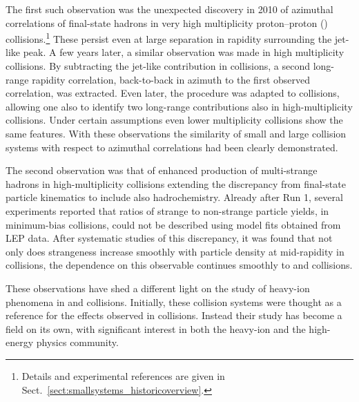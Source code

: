 \documentclass[../report.tex]{subfiles}
\begin{document}
The first such observation was the unexpected discovery in 2010 of azimuthal correlations of final-state hadrons in very high multiplicity proton--proton (\pp) collisions.\footnote{Details and experimental references are given in Sect.~\ref{sect:smallsystems_historicoverview}.} These persist even at large separation in rapidity surrounding the jet-like peak. A few years later, a similar observation was made in high multiplicity \pPb collisions. By subtracting the jet-like contribution in \pPb collisions, a second long-range rapidity correlation, back-to-back in azimuth to the first observed correlation, was extracted. Even later, the procedure was adapted to \pp collisions, allowing one also to identify two long-range contributions also in high-multiplicity \pp collisions. Under certain assumptions even lower multiplicity \pp collisions show the same features. With these observations the similarity of small and large collision systems with respect to azimuthal correlations had been clearly demonstrated.

The second observation was that of enhanced production of multi-strange hadrons in high-multiplicity \pp collisions extending the discrepancy from final-state particle kinematics to include also hadrochemistry. Already after Run 1, several experiments reported that ratios of strange to non-strange particle yields, in minimum-bias collisions, could not be described using model fits obtained from LEP data. After systematic studies of this discrepancy, it was found that not only does strangeness increase smoothly with particle density at mid-rapidity in \pp collisions, the dependence on this observable continues smoothly to \pPb and \PbPb collisions.

These observations have shed a different light on the study of heavy-ion phenomena in \pp and \pPb collisions. Initially, these collision systems were thought as a reference for the effects observed in \PbPb collisions. Instead their study has become a field on its own, with significant interest in both the heavy-ion and the high-energy physics community.
\end{document}

